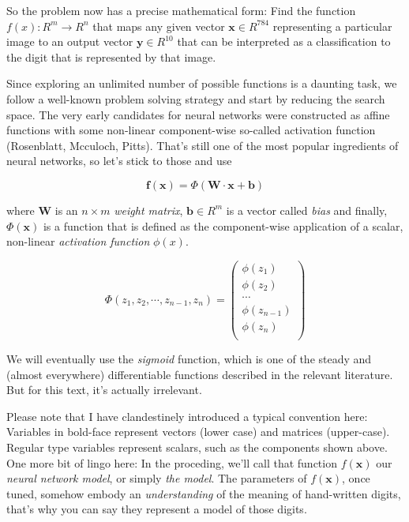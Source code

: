 \documentclass[]{report}
\begin{document}
So the problem now has a precise mathematical form: Find the function \(f(x): R^m \rightarrow R^n\) that maps any given vector \(\mathbf{x} \in R^{784}\) representing a particular image to an output vector \(\mathbf{y} \in R^{10}\) that can be interpreted as a classification to the digit that is represented by that image.

\bigskip

Since exploring an unlimited number of possible functions is a daunting task, we follow a well-known problem solving strategy and start by reducing the search space. The very early candidates for neural networks were constructed as affine functions with some non-linear component-wise so-called activation function (Rosenblatt, Mcculoch, Pitts). That's still one of the most popular ingredients of neural networks, so let's stick to those and use

\begin{equation}
\mathbf{f}(\mathbf{x})=\Phi(\mathbf{W} \cdot \mathbf{x} + \mathbf{b})
\end{equation}

where \(\mathbf{W}\) is an \(n \times m\) \emph{weight matrix}, \(\mathbf{b} \in R^m\)  is a vector called \emph{bias} and finally, \( \Phi( \mathbf{x})  \) is a function that is defined as the component-wise application of a scalar, non-linear \emph{activation function} \(\phi(x)\).

\begin{equation}
\Phi(z_1, z_2, \cdots, z_{n-1}, z_n) =
\left(
\begin{array}{l}
\phi(z_1) \\
\phi(z_2) \\
\cdots \\
\phi(z_{n-1}) \\
\phi(z_n) \\
\end{array}
\right)
\end{equation}


We will eventually use the \emph{sigmoid} function, which is one of the steady and (almost everywhere) differentiable functions described in the relevant literature. But for this text, it's actually irrelevant.

Please note that I have clandestinely introduced a typical convention here: Variables in bold-face represent vectors (lower case) and matrices (upper-case). Regular type variables represent scalars, such as the components shown above. One more bit of lingo here: In the proceding, we'll call that function \( f( \mathbf{x})  \) our \emph{neural network model}, or simply \emph{the model}. The parameters of \( f( \mathbf{x})\), once tuned, somehow embody an \emph{understanding} of the meaning of hand-written digits, that's why you can say they represent a model of those digits.
\end{document}
